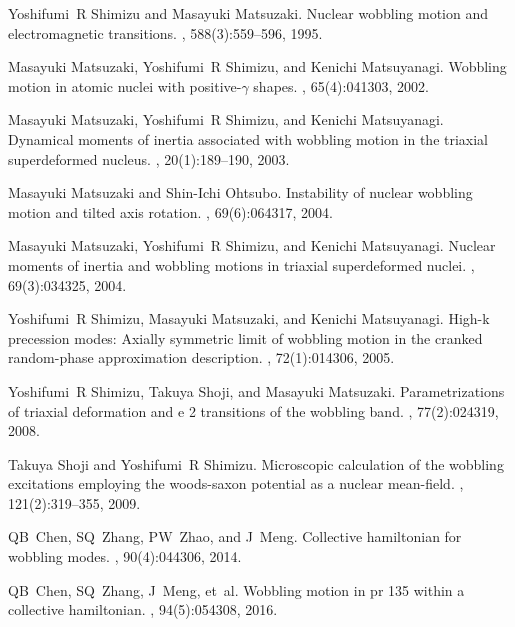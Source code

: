 \documentclass[11pt]{article}
\begin{document}
\begin{thebibliography}{99}
Yoshifumi~R Shimizu and Masayuki Matsuzaki.
\newblock Nuclear wobbling motion and electromagnetic transitions.
, 588(3):559--596, 1995.

Masayuki Matsuzaki, Yoshifumi~R Shimizu, and Kenichi Matsuyanagi.
\newblock Wobbling motion in atomic nuclei with positive-$\gamma$ shapes.
, 65(4):041303, 2002.

Masayuki Matsuzaki, Yoshifumi~R Shimizu, and Kenichi Matsuyanagi.
\newblock Dynamical moments of inertia associated with wobbling motion in the
  triaxial superdeformed nucleus.
,
  20(1):189--190, 2003.

Masayuki Matsuzaki and Shin-Ichi Ohtsubo.
\newblock Instability of nuclear wobbling motion and tilted axis rotation.
, 69(6):064317, 2004.

Masayuki Matsuzaki, Yoshifumi~R Shimizu, and Kenichi Matsuyanagi.
\newblock Nuclear moments of inertia and wobbling motions in triaxial
  superdeformed nuclei.
, 69(3):034325, 2004.

Yoshifumi~R Shimizu, Masayuki Matsuzaki, and Kenichi Matsuyanagi.
\newblock High-k precession modes: Axially symmetric limit of wobbling motion
  in the cranked random-phase approximation description.
, 72(1):014306, 2005.

Yoshifumi~R Shimizu, Takuya Shoji, and Masayuki Matsuzaki.
\newblock Parametrizations of triaxial deformation and e 2 transitions of the
  wobbling band.
, 77(2):024319, 2008.

Takuya Shoji and Yoshifumi~R Shimizu.
\newblock Microscopic calculation of the wobbling excitations employing the
  woods-saxon potential as a nuclear mean-field.
, 121(2):319--355, 2009.

QB~Chen, SQ~Zhang, PW~Zhao, and J~Meng.
\newblock Collective hamiltonian for wobbling modes.
, 90(4):044306, 2014.

QB~Chen, SQ~Zhang, J~Meng, et~al.
\newblock Wobbling motion in pr 135 within a collective hamiltonian.
, 94(5):054308, 2016.


\end{thebibliography}
\end{document}
